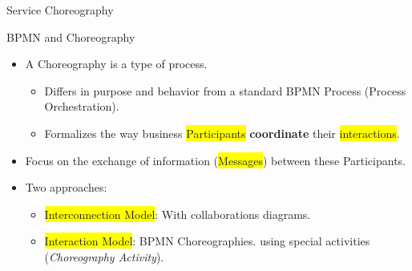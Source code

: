 \documentclass[xcolor=svgnames]{beamer}
\begin{document}
\begin{frame}{Service Choreography}
{          }
    \end{frame}




  \begin{frame}{BPMN and Choreography}
    \begin{itemize}
      \item <1-> A Choreography is a type of process.
	\begin{itemize}
	  \item Differs in purpose and behavior from a standard BPMN Process (Process Orchestration).
	  \item Formalizes the way business \colorbox{yellow}{Participants} \textbf{coordinate} their \colorbox{yellow}{interactions}.
	\end{itemize}
      \item <2-> Focus on the exchange of information (\colorbox{yellow}{Messages}) between these Participants.
      \item <3-> Two approaches:
	\begin{itemize}
	  \item <4-> \colorbox{yellow}{Interconnection Model}: With collaborations diagrams.
	  \item <5-> \colorbox{yellow}{Interaction Model}:  BPMN Choreographies. using special activities (\textit{Choreography Activity}).
	\end{itemize}
    \end{itemize}

  \end{frame}
\end{document}
